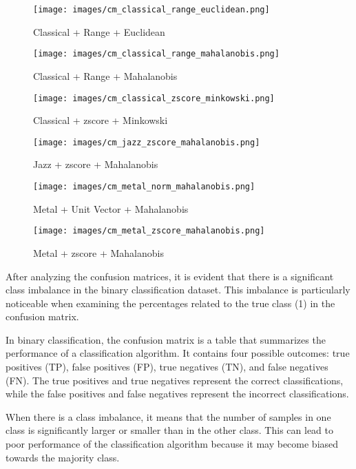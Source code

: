 \documentclass[12pt, a4paper]{article}
\begin{document}
\begin{figure}[H]
\centering
\texttt{[image: images/cm\_classical\_range\_euclidean.png]}
\caption{Classical + Range + Euclidean}
\label{fig:myimage}
\end{figure}

\begin{figure}[H]
\centering
\texttt{[image: images/cm\_classical\_range\_mahalanobis.png]}
\caption{Classical + Range + Mahalanobis}
\label{fig:myimage}
\end{figure}

\begin{figure}[H]
\centering
\texttt{[image: images/cm\_classical\_zscore\_minkowski.png]}
\caption{Classical + zscore + Minkowski}
\label{fig:myimage}
\end{figure}

\begin{figure}[H]
\centering
\texttt{[image: images/cm\_jazz\_zscore\_mahalanobis.png]}
\caption{Jazz + zscore + Mahalanobis}
\label{fig:myimage}
\end{figure}

\begin{figure}[H]
\centering
\texttt{[image: images/cm\_metal\_norm\_mahalanobis.png]}
\caption{Metal + Unit Vector + Mahalanobis}
\label{fig:myimage}
\end{figure}

\begin{figure}[H]
\centering
\texttt{[image: images/cm\_metal\_zscore\_mahalanobis.png]}
\caption{Metal + zscore + Mahalanobis}
\label{fig:myimage}
\end{figure}

After analyzing the confusion matrices, it is evident that there is a significant class imbalance in the binary classification dataset. This imbalance is particularly noticeable when examining the percentages related to the true class (1) in the confusion matrix.

In binary classification, the confusion matrix is a table that summarizes the performance of a classification algorithm. It contains four possible outcomes: true positives (TP), false positives (FP), true negatives (TN), and false negatives (FN). The true positives and true negatives represent the correct classifications, while the false positives and false negatives represent the incorrect classifications.

When there is a class imbalance, it means that the number of samples in one class is significantly larger or smaller than in the other class. This can lead to poor performance of the classification algorithm because it may become biased towards the majority class.
\end{document}
